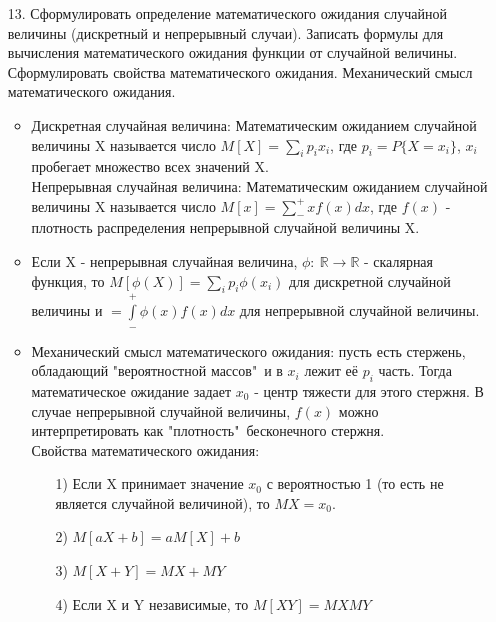 \documentclass[a4paper]{article}
\begin{document}
\begin{enumerate}
\item[13.] Сформулировать определение математического ожидания случайной величины (дискретный и непрерывный случаи). Записать формулы для вычисления математического ожидания функции от случайной величины. Сформулировать свойства математического ожидания. Механический смысл математического ожидания. \\
\begin{itemize}
\item Дискретная случайная величина: Математическим ожиданием случайной величины X называется число $M[X] = \sum\limits_{i} p_i x_i$, где $p_i = P\{X = x_i\}$, $x_i$ пробегает множество всех значений X. \\
Непрерывная случайная величина: Математическим ожиданием случайной величины X называется число $\displaystyle M[x] = \sum\limits_{-}^{+} x f(x) dx$, где $f(x)$ - плотность распределения непрерывной случайной величины X.
\item Если X - непрерывная случайная величина, $\phi: \ \mathbb{R} \to \mathbb{R}$ - скалярная функция, то $M[\phi(X)] = \sum\limits_{i} p_i \phi(x_i)$ для дискретной случайной величины и $\displaystyle  = \int\limits_{-}^{+} \phi(x) f(x) dx$ для непрерывной случайной величины.
\item Механический смысл математического ожидания: пусть есть стержень, обладающий "вероятностной массов"\ и в $x_i$ лежит её $p_i$ часть. Тогда математическое ожидание задает $x_0$ - центр тяжести для этого стержня. В случае непрерывной случайной величины, $f(x)$ можно интерпретировать как "плотность"\ бесконечного стержня. \\
Свойства математического ожидания: \\
	\begin{enumerate}
	\item[1)] Если X принимает значение $x_0$ с вероятностью 1 (то есть не является случайной величиной), то $MX = x_0$.
	\item[2)] $M[aX + b] = aM[X] + b$
	\item[3)] $M[X + Y] = MX + MY$
	\item[4)] Если X и Y независимые, то $M[XY] = MXMY$
	\end{enumerate}
\end{itemize}



\end{enumerate}
\end{document}
